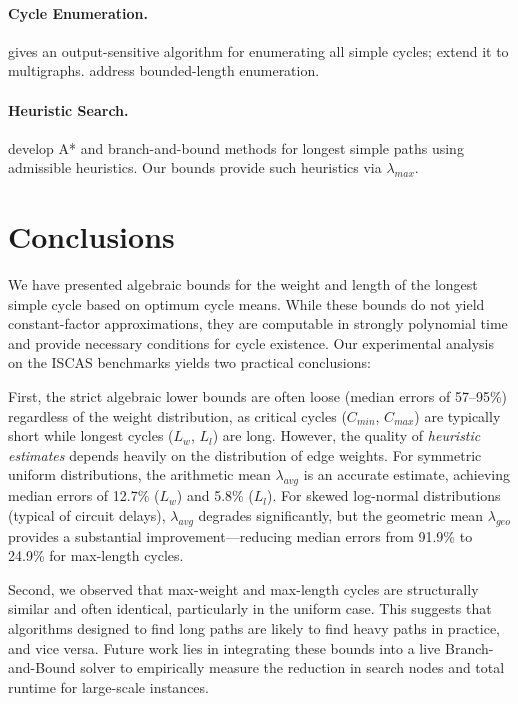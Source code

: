 \documentclass{article}
\theoremstyle{definition}
\begin{document}
\paragraph{Cycle Enumeration.}
\citet{Jo75} gives an output-sensitive algorithm for enumerating all
simple cycles; \citet{HaJa08} extend it to multigraphs. \citet{GuSu21}
address bounded-length enumeration.

\paragraph{Heuristic Search.}
\citet{MoJaSaSe16,StPuFe14,CoStFe20} develop A* and branch-and-bound
methods for longest simple paths using admissible heuristics. Our
bounds provide such heuristics via $\lambda_{max}$.

\section{Conclusions}
\label{sec:conclusions}

We have presented algebraic bounds for the weight and length of the
longest simple cycle based on optimum cycle means. While these bounds
do not yield constant-factor approximations, they are computable in
strongly polynomial time and provide necessary conditions for cycle
existence. Our experimental analysis on the ISCAS benchmarks yields
two practical conclusions:

First, the strict algebraic lower bounds are often loose (median
errors of 57--95\%) regardless of the weight distribution, as critical
cycles ($C_{min}$, $C_{max}$) are typically short while longest cycles
($L_w$, $L_l$) are long. However, the quality of \textit{heuristic estimates}
depends heavily on the distribution of edge weights. For symmetric
uniform distributions, the arithmetic mean $\lambda_{avg}$ is an
accurate estimate, achieving median errors of 12.7\% ($L_w$) and
5.8\% ($L_l$). For skewed log-normal distributions (typical of circuit
delays), $\lambda_{avg}$ degrades significantly, but the geometric
mean $\lambda_{geo}$ provides a substantial improvement---reducing
median errors from 91.9\% to 24.9\% for max-length cycles.

Second, we observed that max-weight and max-length cycles are
structurally similar and often identical, particularly in the uniform
case. This suggests that algorithms designed to find long paths are
likely to find heavy paths in practice, and vice versa. Future work
lies in integrating these bounds into a live Branch-and-Bound solver
to empirically measure the reduction in search nodes and total runtime
for large-scale instances.



\end{document}
